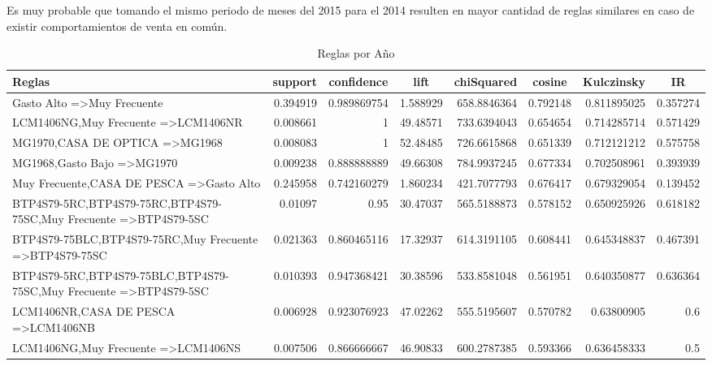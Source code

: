 \documentclass[]{article}
\begin{document}
Es muy probable que tomando el mismo periodo de meses del 2015 para el 2014 resulten en mayor cantidad de reglas similares en caso de existir comportamientos de venta en común.\\

\begin{landscape}
	\begin{table}[htbp]
		\centering
		\caption{Reglas por Año}
		\begin{tabular}{lrrrrrrr}
			\huge Reglas & \multicolumn{1}{c}{support} & \multicolumn{1}{c}{confidence} & \multicolumn{1}{c}{lift} & \multicolumn{1}{c}{chiSquared} & \multicolumn{1}{c}{cosine} & \multicolumn{1}{c}{Kulczinsky} & \multicolumn{1}{c}{IR} \\
			\hline	
			{Gasto Alto} =\textgreater {Muy Frecuente} & 0.394919 & 0.989869754 & 1.588929 & 658.8846364 & 0.792148 & 0.811895025 & 0.357274 \\
			{LCM1406NG,Muy Frecuente} =\textgreater {LCM1406NR} & 0.008661 & 1     & 49.48571 & 733.6394043 & 0.654654 & 0.714285714 & 0.571429 \\
			{MG1970,CASA DE OPTICA} =\textgreater {MG1968} & 0.008083 & 1     & 52.48485 & 726.6615868 & 0.651339 & 0.712121212 & 0.575758 \\
			{MG1968,Gasto Bajo} =\textgreater {MG1970} & 0.009238 & 0.888888889 & 49.66308 & 784.9937245 & 0.677334 & 0.702508961 & 0.393939 \\
			{Muy Frecuente,CASA DE PESCA} =\textgreater {Gasto Alto} & 0.245958 & 0.742160279 & 1.860234 & 421.7077793 & 0.676417 & 0.679329054 & 0.139452 \\
			{BTP4S79-5RC,BTP4S79-75RC,BTP4S79-75SC,Muy Frecuente} =\textgreater {BTP4S79-5SC} & 0.01097 & 0.95  & 30.47037 & 565.5188873 & 0.578152 & 0.650925926 & 0.618182 \\
			{BTP4S79-75BLC,BTP4S79-75RC,Muy Frecuente} =\textgreater {BTP4S79-75SC} & 0.021363 & 0.860465116 & 17.32937 & 614.3191105 & 0.608441 & 0.645348837 & 0.467391 \\
			{BTP4S79-5RC,BTP4S79-75BLC,BTP4S79-75SC,Muy Frecuente} =\textgreater {BTP4S79-5SC} & 0.010393 & 0.947368421 & 30.38596 & 533.8581048 & 0.561951 & 0.640350877 & 0.636364 \\
			{LCM1406NR,CASA DE PESCA} =\textgreater {LCM1406NB} & 0.006928 & 0.923076923 & 47.02262 & 555.5195607 & 0.570782 & 0.63800905 & 0.6 \\
			{LCM1406NG,Muy Frecuente} =\textgreater {LCM1406NS} & 0.007506 & 0.866666667 & 46.90833 & 600.2787385 & 0.593366 & 0.636458333 & 0.5 \\

\end{tabular}
\end{table}
\end{landscape}
\end{document}
